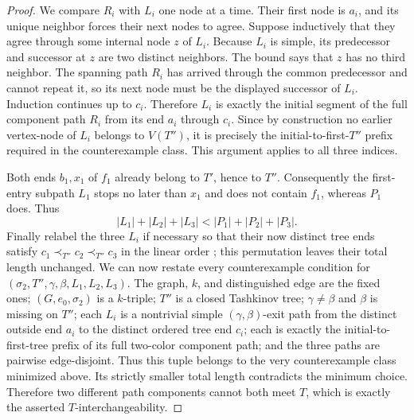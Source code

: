 \begin{proof}
We compare $R_i$ with $L_i$ one node at a time.  Their first node is
$a_i$, and its unique neighbor forces their next nodes to agree.  Suppose
inductively that they agree through some internal node $z$ of $L_i$.
Because $L_i$ is simple, its predecessor and successor at $z$ are two
distinct neighbors.  The bound
 says that $z$ has no third
neighbor.  The spanning path $R_i$ has arrived through the common
predecessor and cannot repeat it, so its next node must be the displayed
successor of $L_i$.  Induction continues up to $c_i$.  Therefore $L_i$ is
exactly the initial segment of the full component path $R_i$ from its end
$a_i$ through $c_i$.  Since by construction no earlier vertex-node of
$L_i$ belongs to $V(T'')$, it is precisely the initial-to-first-$T''$
prefix required in the counterexample class.  This argument applies to
all three indices.

Both ends $b_1,x_1$ of $f_1$ already belong to $T'$, hence to $T''$.
Consequently the first-entry subpath $L_1$ stops no later than $x_1$ and
does not contain $f_1$, whereas $P_1$ does.  Thus
\[
 |L_1|+|L_2|+|L_3|<|P_1|+|P_2|+|P_3|.
\]
Finally relabel the three $L_i$ if necessary so that their now distinct
tree ends satisfy $c_1\prec_{T''}c_2\prec_{T''}c_3$ in the linear order
; this permutation leaves their total length
unchanged.  We can now restate every counterexample condition for
$(\sigma_2,T'',\gamma,\beta,L_1,L_2,L_3)$.  The graph, $k$, and
distinguished edge are the fixed ones; $(G,e_0,\sigma_2)$ is a $k$-triple;
$T''$ is a closed Tashkinov tree; $\gamma\ne\beta$ and $\beta$ is missing
on $T''$; each $L_i$ is a nontrivial simple $(\gamma,\beta)$-exit path
from the distinct outside end $a_i$ to the distinct ordered tree end
$c_i$; each is exactly the initial-to-first-tree prefix of its full
two-color component path; and the three paths are pairwise edge-disjoint.
Thus this tuple belongs to the very counterexample class minimized above.
Its strictly smaller total length contradicts the minimum choice.
Therefore two different path components cannot both meet $T$, which is
exactly the asserted $T$-interchangeability.
\end{proof}
